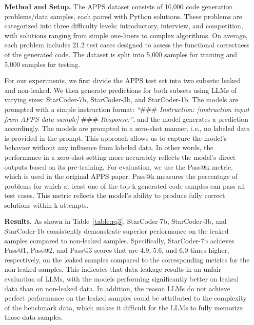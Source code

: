 \vspace{0.2cm}
\noindent
\textbf{Method and Setup.}
The APPS dataset consists of 10,000 code generation problems/data samples, each paired with Python solutions. These problems are categorized into three difficulty levels: introductory, interview, and competition, with solutions ranging from simple one-liners to complex algorithms. On average, each problem includes 21.2 test cases designed to assess the functional correctness of the generated code. The dataset is split into 5,000 samples for training and 5,000 samples for testing.

For our experiments, we first divide the APPS test set into two subsets: leaked and non-leaked. We then generate predictions for both subsets using LLMs of varying sizes: StarCoder-7b, StarCoder-3b, and StarCoder-1b. The models are prompted with a simple instruction format: \textit{``$\#\#\#$ Instruction: [instruction input from APPS data sample] $\#\#\#$ Response:''}, and the model generates a prediction accordingly. The models are prompted in a zero-shot manner, i.e., no labeled data is provided in the prompt. This approach allows us to capture the model's behavior without any influence from labeled data. In other words, the performance in a zero-shot setting more accurately reflects the model's direct outputs based on its pre-training.
For evaluation, we use the Pass@k metric, which is used in the original APPS paper. Pass@k measures the percentage of problems for which at least one of the top-k generated code samples can pass all test cases. This metric reflects the model's ability to produce fully correct solutions within k attempts.

\vspace{0.2cm}
\noindent
\textbf{Results.}
As shown in Table~\ref{table:rq3}, StarCoder-7b, StarCoder-3b, and StarCoder-1b consistently demonstrate superior performance on the leaked samples compared to non-leaked samples. Specifically, StarCoder-7b achieves Pass@1, Pass@2, and Pass@3 scores that are 4.9, 5.6, and 6.0 times higher, respectively, on the leaked samples compared to the corresponding metrics for the non-leaked samples. This indicates that data leakage results in an unfair evaluation of LLMs, with the models performing significantly better on leaked data than on non-leaked data.
In addition, the reason LLMs do not achieve perfect performance on the leaked samples could be attributed to the complexity of the benchmark data, which makes it difficult for the LLMs to fully memorize those data samples. 



